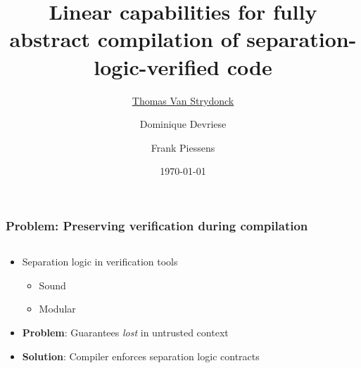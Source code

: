 \documentclass{beamer}
\title[Linear Capability Verification]{Linear capabilities for fully abstract
compilation of separation-logic-verified code} %
\author[Thomas Van Strydonck]{\underline{Thomas Van Strydonck} \and Dominique Devriese \and Frank Piessens} %
\institute[KU Leuven] %
{
KU Leuven \\ %
\medskip
\textit{thomas.vanstrydonck@cs.kuleuven.be} %
}
\date{\today} %
\begin{document}


\begin{frame}
\titlepage %
\end{frame}

\begin{frame}
\frametitle{Problem: Preserving verification during compilation}

\begin{columns}
\begin{column}{0.65\textwidth}
\begin{itemize}
\item Separation logic in verification tools
	\begin{itemize}
	\item Sound
	\item Modular
	\end{itemize}
\item \textbf{Problem}: Guarantees \emph{lost} in untrusted context %
\item \textbf{Solution}: Compiler enforces separation logic contracts  %
\end{itemize}
\end{column}
\begin{column}{0.37\textwidth}
\def\firstcircle{(0,0) circle (2cm)}
\def\secondcircle{(0,0) circle (1.3cm)}

\end{column}
\end{columns}
\end{frame}

\end{document}
